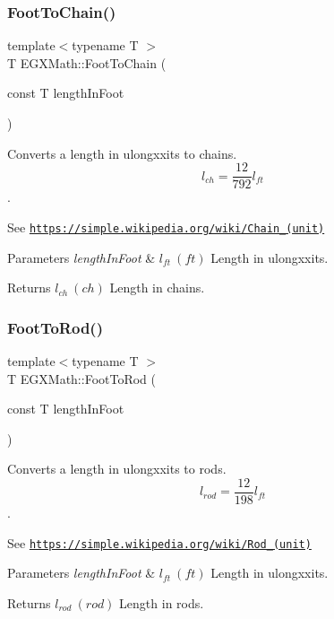 \subsubsection{\texorpdfstring{Foot\+To\+Chain()}{FootToChain()}}
{\footnotesize\ttfamily template$<$typename T $>$ \\
T E\+G\+X\+Math\+::\+Foot\+To\+Chain (\begin{DoxyParamCaption}\item[{const T}]{length\+In\+Foot }\end{DoxyParamCaption})}



Converts a length in ulongxxits to chains. \[ l_{ch}= \frac{12}{792} l_{ft} \]. 

See \href{https://simple.wikipedia.org/wiki/Chain_(unit)}{\tt https\+://simple.\+wikipedia.\+org/wiki/\+Chain\+\_\+(unit)} 
\begin{DoxyParams}{Parameters}
{\em length\+In\+Foot} & $ l_{ft}\ (ft)$ Length in ulongxxits. \\
\hline
\end{DoxyParams}
\begin{DoxyReturn}{Returns}
$ l_{ch}\ (ch)$ Length in chains. 
\end{DoxyReturn}
\mbox{\label{group___e_g_x_math-_conversions-_length_conversions-_imperial-_foot-_surveyors_gace4054ff26544ac7fa6717cec4ce9491}} 
\subsubsection{\texorpdfstring{Foot\+To\+Rod()}{FootToRod()}}
{\footnotesize\ttfamily template$<$typename T $>$ \\
T E\+G\+X\+Math\+::\+Foot\+To\+Rod (\begin{DoxyParamCaption}\item[{const T}]{length\+In\+Foot }\end{DoxyParamCaption})}



Converts a length in ulongxxits to rods. \[ l_{rod}= \frac{12}{198} l_{ft} \]. 

See \href{https://simple.wikipedia.org/wiki/Rod_(unit)}{\tt https\+://simple.\+wikipedia.\+org/wiki/\+Rod\+\_\+(unit)} 
\begin{DoxyParams}{Parameters}
{\em length\+In\+Foot} & $ l_{ft}\ (ft)$ Length in ulongxxits. \\
\hline
\end{DoxyParams}
\begin{DoxyReturn}{Returns}
$ l_{rod}\ (rod)$ Length in rods. 
\end{DoxyReturn}
